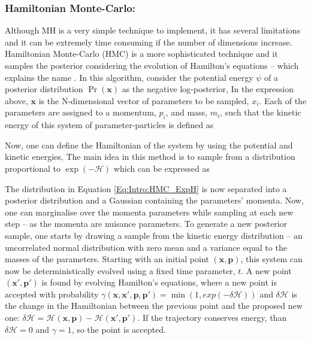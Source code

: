 \subsubsection{Hamiltonian Monte-Carlo:}
Although MH is a very simple technique to implement, it has several limitations and it can be extremely time consuming if the number of dimensions increase. Hamiltonian Monte-Carlo (HMC) is a more sophisticated technique and it samples the posterior considering the evolution of Hamilton's equations -- which explains the name \citep{Taylor2008}. In this algorithm, consider the potential energy $\psi$ of a posterior distribution $\Pr(\bm{x})$ as the negative log-posterior,
In the expression above, $\bm{x}$ is the N-dimensional vector of parameters to be sampled, $x_i$. Each of the parameters are assigned to a momentum, $p_i$, and mass, $m_i$, such that the kinetic energy of this system of parameter-particles is defined as

\qquad Now, one can define the Hamiltonian of the system by using the potential and kinetic energies,
The main idea in this method is to sample from a distribution proportional to $\exp(-\mathcal{H})$ which can be expressed as

\qquad The distribution in Equation \eqref{Eq:Intro:HMC_ExpH} is now separated into a posterior distribution and a Gaussian containing the parameters' momenta. Now, one can marginalise over the momenta parameters while sampling at each new step -- as the momenta are nuisance parameters. To generate a new posterior sample, one starts by drawing a sample from the kinetic energy distribution -- an uncorrelated normal distribution with zero mean and a variance equal to the masses of the parameters. Starting with an initial point $(\bm{x}, \bm{p})$, this system can now be deterministically evolved using a fixed time parameter, $t$. A new point $(\bm{x}', \bm{p}')$ is found by evolving Hamilton's equations,
where a new point is accepted with probability $\gamma(\bm{x}, \bm{x}', \bm{p}, \bm{p}') = \min(1, exp(-\delta\mathcal{H}))$ and $\delta\mathcal{H}$ is the change in the Hamiltonian between the previous point and the proposed new one: $\delta\mathcal{H} = \mathcal{H}(\bm{x}, \bm{p}) - \mathcal{H}(\bm{x}', \bm{p}')$. If the trajectory conserves energy, than $\delta\mathcal{H} = 0$ and $\gamma =1$, so the point is accepted. 

